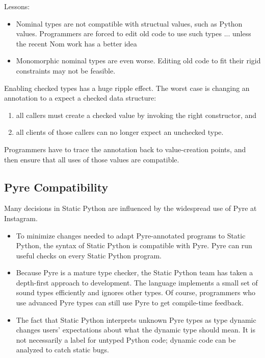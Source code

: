 \documentclass[english,cleveref,submission]{programming}
\newcommand{\SP}{Static Python}
\begin{document}
Lessons:
\begin{itemize}
  \item
    Nominal types are not compatible with structual values, such as Python values.
    Programmers are forced to edit old code to use such types ... unless the recent Nom work has a better idea~\cite{mt-oopsla-2021}
  \item
    Monomorphic nominal types are even worse.
    Editing old code to fit their rigid constraints may not be feasible.

\end{itemize}

Enabling checked types has a huge ripple effect.
The worst case is changing an annotation to a expect a checked data structure:
\begin{enumerate}
  \item all callers must create a checked value by invoking the right constructor, and
  \item all clients of those callers can no longer expect an unchecked type.
\end{enumerate}
Programmers have to trace the annotation back to value-creation points, and then
ensure that all uses of those values are compatible.


\subsection{Pyre Compatibility}

Many decisions in \SP{} are influenced by the widespread use of Pyre at Instagram.
\begin{itemize}
  \item
    To minimize changes needed to adapt Pyre-annotated programs
    to \SP{}, the syntax of \SP{} is compatible with Pyre.
    Pyre can run useful checks on every \SP{} program.
  \item
    Because Pyre is a mature type checker, the \SP{} team has taken a
    depth-first approach to development.
    The language implements a small set of sound types efficiently and ignores
    other types.
    Of course, programmers who use advanced Pyre types can still use Pyre to
    get compile-time feedback.
  \item
    The fact that \SP{} interprets unknown Pyre types as type dynamic changes
    users' expectations about what the dynamic type should mean.
    It is not necessarily a label for untyped Python code; dynamic code
    can be analyzed to catch static bugs.
\end{itemize}
\end{document}

